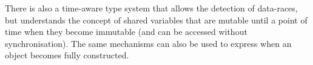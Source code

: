 There is also a time-aware type system \cite{Matsakis:2010:TTS:1869459.1869511}
that allows the detection of data-races, but understands the concept of shared
variables that are mutable until a point of time when they become immutable
(and can be accessed without synchronisation).  The same mechanisms can also be
used to express when an object becomes fully constructed.
